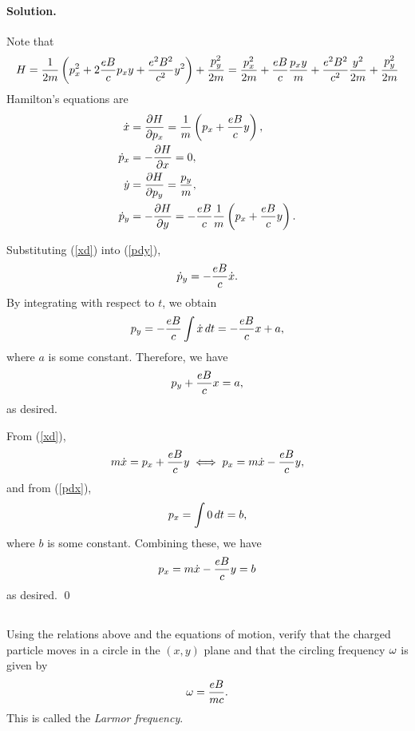 \documentclass[11pt]{article}
\newcommand{\refeq}[1]{(\ref{#1})}
\newcommand{\beq}{\begin{equation*}}
\newcommand{\eeq}{\end{equation*}}
\newcommand{\beqn}{\begin{equation}}
\newcommand{\eeqn}{\end{equation}}
\newenvironment{problem}
{
	\subsection{}
	\color{darkgray}
    \ignorespaces
}
{

}
\newenvironment{solution}
{
    \paragraph{Solution.}
    \ignorespaces
}
{
    \bigskip
}
\begin{document}
\begin{solution}
	Note that
	\beq
		H = \frac{1}{2m} \left( \px^2 + 2 \frac{e B}{c} \px y + \frac{e^2 B^2}{c^2} y^2 \right) + \frac{\py^2}{2m}
		= \frac{\px^2}{2m} + \frac{e B}{c} \frac{\px y}{m} + \frac{e^2 B^2}{c^2} \frac{y^2}{2m} + \frac{\py^2}{2m}
	\eeq
	Hamilton's equations are
	\begin{align}
		\dot{x} &= \pdv{H}{p_x} = \frac{1}{m} \left( p_x + \frac{e B}{c} y \right), \label{xd} \\
		\dot{p}_x &= -\pdv{H}{x} = 0, \label{pdx} \\
		\dot{y} &= \pdv{H}{p_y} = \frac{p_y}{m}, \label{yd} \\
		\dot{p}_y &= -\pdv{H}{y} = -\frac{e B}{c} \frac{1}{m} \left( p_x + \frac{e B}{c} y \right). \label{pdy}
	\end{align}
	
	Substituting \refeq{xd} into \refeq{pdy},
	\beq
		\pdy = -\frac{e B}{c} \xd.
	\eeq
	By integrating with respect to $t$, we obtain
	\beq
		\py = -\frac{e B}{c} \int \xd \dd{t} = -\frac{e B}{c} x + a,
	\eeq 
	where $a$ is some constant.  Therefore, we have
	\beqn \label{a}
		\py + \frac{e B}{c} x = a,
	\eeqn
	as desired.
	
	From \refeq{xd},
	\beq
		m \xd = \px + \frac{e B}{c} y
		\iff
		\px = m \xd - \frac{e B}{c} y,
	\eeq
	and from \refeq{pdx},
	\beq
		\px = \int 0 \dd{t} = b,
	\eeq
	where $b$ is some constant.  Combining these, we have
	\beqn \label{b}
		\px = m \xd - \frac{e B}{c} y = b
	\eeqn
	as desired. \qed
\end{solution}

\newcommand{\xdd}{\ddot{x}}
\newcommand{\ydd}{\ddot{y}}

\newcommand{\xc}{x_c}
\newcommand{\yc}{y_c}
\newcommand{\xddc}{\ddot{x}_c}
\newcommand{\yddc}{\ddot{y}_c}

\newcommand{\xxt}{x(t)}
\newcommand{\yyt}{y(t)}
\newcommand{\xct}{\xc(t)}
\newcommand{\yct}{\yc(t)}
\newcommand{\xpt}{x_p(t)}
\newcommand{\ypt}{y_p(t)}

\begin{problem}
	Using the relations above and the equations of motion, verify that the charged particle moves in a circle in the $(x, y)$ plane and that the circling frequency $\omega$ is given by
	\beq
		\omg = \frac{e B}{m c}.
	\eeq
This is called the \emph{Larmor frequency}.
\end{problem}
\end{document}
